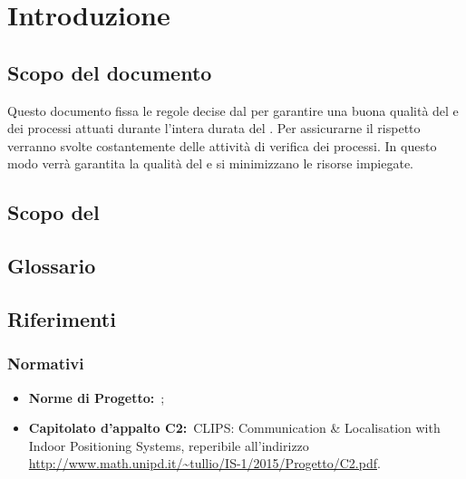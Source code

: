 
\section{Introduzione}
\label{sec:1}
	\subsection{Scopo del documento}
	\label{sec:1.1}
	Questo documento fissa le regole decise dal  per garantire una buona qualità del  e dei processi attuati durante l'intera durata del . Per assicurarne il rispetto verranno svolte costantemente delle attività di verifica dei processi. In questo modo verrà garantita la qualità del  e si minimizzano le risorse impiegate.
	
	\subsection{Scopo del }
	\label{sec:1.2}
	\SCOPO
	
	\subsection{Glossario}
	\label{sec:1.3}
	\GLOSSARIO
	
	\subsection{Riferimenti}
	\label{sec:1.4}
		\subsubsection{Normativi}
		\label{sec:1.4.1}
			\begin{itemize}
				\item \textbf{Norme di Progetto:}\ \NPdoc;
				\item \textbf{Capitolato d'appalto C2:}\ CLIPS: Communication \& Localisation with Indoor Positioning Systems, reperibile all'indirizzo \url{http://www.math.unipd.it/~tullio/IS-1/2015/Progetto/C2.pdf}.
			\end{itemize}
	
